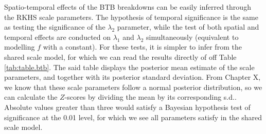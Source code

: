 \documentclass[a4paper,showframe,11pt]{report}\usepackage[]{graphicx}\usepackage[]{color}
\begin{document}
Spatio-temporal effects of the BTB breakdowns can be easily inferred through the RKHS scale parameters.
The hypothesis of temporal significance is the same as testing the significance of the $\lambda_2$ parameter, while the test of both spatial and temporal effects are conducted on $\lambda_1$ and $\lambda_2$ simultaneously (equivalent to modelling $f$ with a constant).
For these tests, it is simpler to infer from the shared scale model, for which we can read the results directly of off Table \ref{tab:table.btb}.
The said table displays the posterior mean estimate of the scale parameters, and together with its posterior standard deviation.
From Chapter X, we know that these scale parameters follow a normal posterior distribution, so we can calculate the $Z$-scores by dividing the mean by its corresponding s.d..
Absolute values greater than three would satisfy a Bayesian hypothesis test of significance at the 0.01 level, for which we see all parameters satisfy in the shared scale model.
\end{document}
